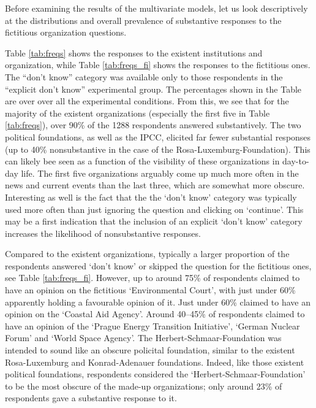 \documentclass[Royal,times,sageh]{sagej}
\begin{document}
Before examining the results of the multivariate models, let us look
descriptively at the distributions and overall prevalence of substantive
responses to the fictitious organization questions.

Table \ref{tab:freqs} shows the responses to the existent institutions
and organization, while Table \ref{tab:freqs_fi} shows the responses to
the fictitious ones. The ``don't know'' category was available only to
those respondents in the ``explicit don't know'' experimental group. The
percentages shown in the Table are over over all the experimental
conditions. From this, we see that for the majority of the existent
organizations (especially the first five in Table \ref{tab:freqs}), over
90\% of the 1288 respondents answered substantively. The two political
foundations, as well as the IPCC, elicited far fewer substantial
responses (up to 40\% nonsubstantive in the case of the
Rosa-Luxemburg-Foundation). This can likely bee seen as a function of
the visibility of these organizations in day-to-day life. The first five
organizations arguably come up much more often in the news and current
events than the last three, which are somewhat more obscure. Interesting
as well is the fact that the the `don't know' category was typically
used more often than just ignoring the question and clicking on
`continue'. This may be a first indication that the inclusion of an
explicit `don't know' category increases the likelihood of
nonsubstantive responses.

Compared to the existent organizations, typically a larger proportion of
the respondents answered `don't know' or skipped the question for the
fictitious ones, see Table \ref{tab:freqs_fi}. However, up to around
75\% of respondents claimed to have an opinion on the fictitious
`Environmental Court', with just under 60\% apparently holding a
favourable opinion of it. Just under 60\% claimed to have an opinion on
the `Coastal Aid Agency'. Around 40--45\% of respondents claimed to have
an opinion of the `Prague Energy Transition Initiative', `German Nuclear
Forum' and `World Space Agency'. The Herbert-Schmaar-Foundation was
intended to sound like an obscure policital foundation, similar to the
existent Rosa-Luxemburg and Konrad-Adenauer foundations. Indeed, like
those existent political foundations, respondents considered the
`Herbert-Schmaar-Foundation' to be the most obscure of the made-up
organizations; only around 23\% of respondents gave a substantive
response to it.
\end{document}
